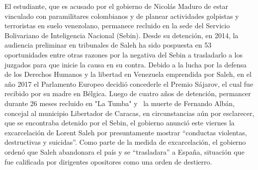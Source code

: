 \documentclass{article}%
\begin{document}
\newline%
%
El estudiante, que es acusado por el gobierno de Nicolás Maduro de estar vinculado con paramilitares colombianos y de planear actividades golpistas y terroristas en suelo venezolano, permanece recluido en la sede del Servicio Bolivariano de Inteligencia Nacional (Sebin).%
\newline%
%
Desde su detención, en 2014, la audiencia preliminar en tribunales de Saleh ha sido pospuesta en 53 oportunidades entre otras razones por la negativa del Sebin a trasladarlo a los juzgados para que inicie la causa en su contra.%
\newline%
%
Debido a la lucha por la defensa de los Derechos Humanos y la libertad en Venezuela emprendida por Saleh, en el año 2017 el Parlamento Europeo decidió concederle el Premio Sájarov, el cual fue recibido por su madre en Bélgica.%
\newline%
%
Luego de cuatro años de detención, permancer durante 26 meses recluido en "La Tumba" y ~la muerte de Fernando Albán, concejal al municipio Libertador de Caracas, en circunstancias aún por esclarecer, que se encontraba detenido por el Sebin, el gobierno anunció este viernes la excarcelación de Lorent Saleh por presuntamente mostrar “conductas violentas, destructivas y suicidas”. Como parte de la medida de excarcelación, el gobierno ordenó que Saleh abandonara el país y se “trasladara” a España, situación que fue calificada por dirigentes opositores como una orden de destierro.%
\newline%
%
\end{document}

